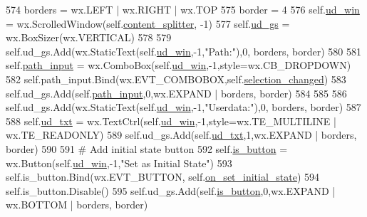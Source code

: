 \begin{DoxyCode}
574         borders = wx.LEFT | wx.RIGHT | wx.TOP
575         border = 4
576         self.\hyperlink{classsmacc__viewer_1_1SmaccViewerFrame_a156f622cd2bb567715ae668735574e1a}{ud\_win} = wx.ScrolledWindow(self.\hyperlink{classsmacc__viewer_1_1SmaccViewerFrame_a601f77701e7f32378b77b1b154e27215}{content\_splitter}, -1)
577         self.\hyperlink{classsmacc__viewer_1_1SmaccViewerFrame_afde6b1e161cbf76307ebc82f15037163}{ud\_gs} = wx.BoxSizer(wx.VERTICAL)
578 
579         self.ud\_gs.Add(wx.StaticText(self.\hyperlink{classsmacc__viewer_1_1SmaccViewerFrame_a156f622cd2bb567715ae668735574e1a}{ud\_win},-1,\textcolor{stringliteral}{"Path:"}),0, borders, border)
580 
581         self.\hyperlink{classsmacc__viewer_1_1SmaccViewerFrame_ab4ef6a1eb110cd0497c3e37bf66b79d7}{path\_input} = wx.ComboBox(self.\hyperlink{classsmacc__viewer_1_1SmaccViewerFrame_a156f622cd2bb567715ae668735574e1a}{ud\_win},-1,style=wx.CB\_DROPDOWN)
582         self.path\_input.Bind(wx.EVT\_COMBOBOX,self.\hyperlink{classsmacc__viewer_1_1SmaccViewerFrame_ad941286fc80f7a40a0adcc6ff839065c}{selection\_changed})
583         self.ud\_gs.Add(self.\hyperlink{classsmacc__viewer_1_1SmaccViewerFrame_ab4ef6a1eb110cd0497c3e37bf66b79d7}{path\_input},0,wx.EXPAND | borders, border)
584 
585 
586         self.ud\_gs.Add(wx.StaticText(self.\hyperlink{classsmacc__viewer_1_1SmaccViewerFrame_a156f622cd2bb567715ae668735574e1a}{ud\_win},-1,\textcolor{stringliteral}{"Userdata:"}),0, borders, border)
587 
588         self.\hyperlink{classsmacc__viewer_1_1SmaccViewerFrame_ab02d72e8e1fa56529513e55da6c3f581}{ud\_txt} = wx.TextCtrl(self.\hyperlink{classsmacc__viewer_1_1SmaccViewerFrame_a156f622cd2bb567715ae668735574e1a}{ud\_win},-1,style=wx.TE\_MULTILINE | wx.TE\_READONLY)
589         self.ud\_gs.Add(self.\hyperlink{classsmacc__viewer_1_1SmaccViewerFrame_ab02d72e8e1fa56529513e55da6c3f581}{ud\_txt},1,wx.EXPAND | borders, border)
590         
591         \textcolor{comment}{# Add initial state button}
592         self.\hyperlink{classsmacc__viewer_1_1SmaccViewerFrame_a9d2088f270fd6dfd646aa23af2fefc69}{is\_button} = wx.Button(self.\hyperlink{classsmacc__viewer_1_1SmaccViewerFrame_a156f622cd2bb567715ae668735574e1a}{ud\_win},-1,\textcolor{stringliteral}{"Set as Initial State"})
593         self.is\_button.Bind(wx.EVT\_BUTTON, self.\hyperlink{classsmacc__viewer_1_1SmaccViewerFrame_aaaf449c0ca69c46b44de8a40d0faadf6}{on\_set\_initial\_state})
594         self.is\_button.Disable()
595         self.ud\_gs.Add(self.\hyperlink{classsmacc__viewer_1_1SmaccViewerFrame_a9d2088f270fd6dfd646aa23af2fefc69}{is\_button},0,wx.EXPAND | wx.BOTTOM | borders, border)

\end{DoxyCode}
